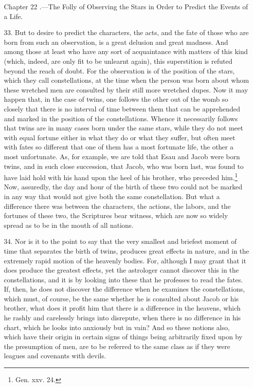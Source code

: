 
Chapter 22 .—The Folly of Observing the Stars in Order to Predict the Events of a Life.

33. But to desire to predict the characters, the acts, and the fate of those who are born from such an observation, is a great delusion and great madness. And among those at least who have any sort of acquaintance with matters of this kind (which, indeed, are only fit to be unlearnt again), this superstition is refuted beyond the reach of doubt. For the observation is of the position of the stars, which they call constellations, at the time when the person was born about whom these wretched men are consulted by their still more wretched dupes. Now it may happen that, in the case of twins, one follows the other out of the womb so closely that there is no interval of time between them that can be apprehended and marked in the position of the constellations. Whence it necessarily follows that twins are in many cases born under the same stars, while they do not meet with equal fortune either in what they do or what they suffer, but often meet with fates so different that one of them has a most fortunate life, the other a most unfortunate. As, for example, we are told that Esau and Jacob were born twins, and in such close succession, that Jacob, who was born last, was found to have laid hold with his hand upon the heel of his brother, who preceded him.\footnote{Gen. xxv. 24.} Now, assuredly, the day and hour of the birth of these two could not be marked in any way that would not give both the same constellation. But what a difference there was between the characters, the actions, the labors, and the fortunes of these two, the Scriptures bear witness, which are now so widely spread as to be in the mouth of all nations.

34. Nor is it to the point to say that the very smallest and briefest moment of time that separates the birth of twins, produces great effects in nature, and in the extremely rapid motion of the heavenly bodies. For, although I may grant that it does produce the greatest effects, yet the astrologer cannot discover this in the constellations, and it is by looking into these that he professes to read the fates. If, then, he does not discover the difference when he examines the constellations, which must, of course, be the same whether he is consulted about Jacob or his brother, what does it profit him that there is a difference in the heavens, which he rashly and carelessly brings into disrepute, when there is no difference in his chart, which he looks into anxiously but in vain? And so these notions also, which have their origin in certain signs of things being arbitrarily fixed upon by the presumption of men, are to be referred to the same class as if they were leagues and covenants with devils.

